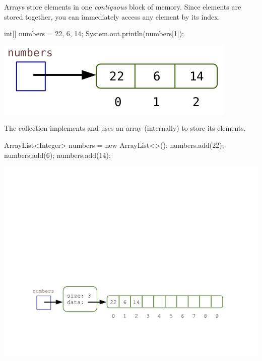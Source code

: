 
Arrays store elements in one \emph{contiguous} block of memory.
Since elements are stored together, you can immediately access any element by its index.

\vspace{1ex}
\begin{minipage}{0.50\linewidth}
\begin{javalst}
    int[] numbers = {22, 6, 14};
    System.out.println(numbers[1]);
\end{javalst}
\end{minipage}
\hfill
\begin{minipage}{0.48\linewidth}
\centering
\includegraphics[scale=0.35]{figs/array1.png}
\end{minipage}
\vspace{1ex}

The  collection implements  and uses an array (internally) to store its elements.

\vspace{1ex}
\begin{minipage}{0.35\linewidth}
\begin{javalst}
    ArrayList<Integer> numbers = new ArrayList<>();
    numbers.add(22);
    numbers.add(6);
    numbers.add(14);
\end{javalst}
\end{minipage}
\hfill
\begin{minipage}{0.63\linewidth}
\vspace*{2em}
\includegraphics[scale=0.45]{figs/array2.pdf}
\end{minipage}
\vspace{1ex}

